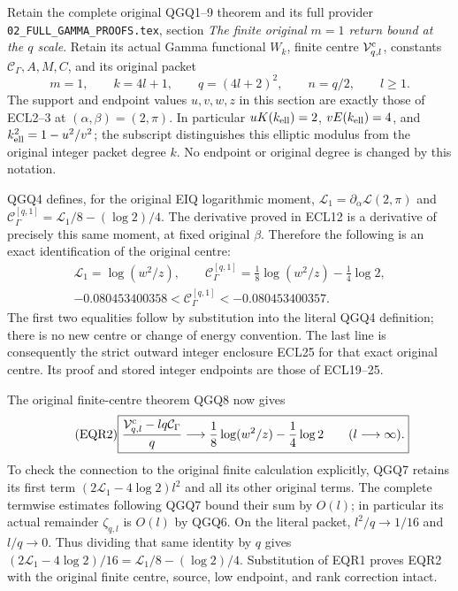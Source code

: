 \documentclass[11pt,a4paper]{article}
\begin{document}
Retain the complete original QGQ1--9 theorem and its full provider
\texttt{02\_FULL\_GAMMA\_PROOFS.tex}, section
\emph{The finite original \(m=1\) return bound at the \(q\) scale}.
Retain its actual Gamma functional $W_k$, finite centre
$\mathcal V^{\rm c}_{q,l}$, constants $\mathcal C_\Gamma,A,M,C$,
and its original packet
\[
m=1,\qquad k=4l+1,\qquad q=(4l+2)^2,\qquad n=q/2,\qquad l\geq1.
\]
The support and endpoint values $u,v,w,z$ in this section are
exactly those of ECL2--3 at $(\alpha,\beta)=(2,\pi)$.
In particular $uK(k_{\rm ell})=2$, $vE(k_{\rm ell})=4$, and
$k_{\rm ell}^2=1-u^2/v^2$; the subscript distinguishes this
elliptic modulus from the original integer packet degree $k$.
No endpoint or original degree is changed by this notation.

QGQ4 defines, for the original EIQ logarithmic moment,
$\mathcal L_1=\partial_\alpha\mathcal L(2,\pi)$ and
$\mathcal C_\Gamma^{[q,1]}=\mathcal L_1/8-(\log2)/4$.
The derivative proved in ECL12 is a derivative of precisely
this same moment, at fixed original $\beta$. Therefore the
following is an exact identification of the original centre:
\begin{equation}\tag{EQR1}
\boxed{\begin{gathered}
\mathcal L_1=\log(w^2/z),\qquad
\mathcal C_\Gamma^{[q,1]}
=\frac18\log(w^2/z)-\frac14\log2,\\
-0.080453400358
<\mathcal C_\Gamma^{[q,1]}
<-0.080453400357.
\end{gathered}}
\end{equation}
The first two equalities follow by substitution into the literal
QGQ4 definition; there is no new centre or change of energy
convention. The last line is consequently the strict outward
integer enclosure ECL25 for that exact original centre. Its
proof and stored integer endpoints are those of ECL19--25.

The original finite-centre theorem QGQ8 now gives
\begin{equation}\tag{EQR2}
\boxed{\displaystyle
\frac{\mathcal V^{\rm c}_{q,l}-lq\mathcal C_\Gamma}{q}
\longrightarrow
\frac18\log(w^2/z)-\frac14\log2
\qquad(l\longrightarrow\infty).}
\end{equation}
To check the connection to the original finite calculation
explicitly, QGQ7 retains its first term
$(2\mathcal L_1-4\log2)l^2$ and all its other original terms.
The complete termwise estimates following QGQ7 bound their
sum by $O(l)$; in particular its actual remainder
$\zeta_{q,l}$ is $O(l)$ by QGQ6. On the literal packet,
$l^2/q\to1/16$ and $l/q\to0$. Thus dividing that same identity
by $q$ gives
$(2\mathcal L_1-4\log2)/16=\mathcal L_1/8-(\log2)/4$.
Substitution of EQR1 proves EQR2 with the original finite centre,
source, low endpoint, and rank correction intact.
\end{document}
